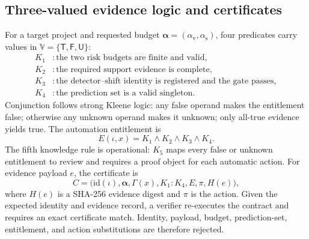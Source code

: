 \documentclass[preprint,12pt]{elsarticle}
\newcommand{\av}{\alpha_{\mathrm{v}}}
\newcommand{\as}{\alpha_{\mathrm{s}}}
\begin{document}
\subsection{Three-valued evidence logic and certificates}

For a target project and requested budget $\boldsymbol{\alpha}=(\av,\as)$, four predicates carry values in $\mathbb V=\{\mathsf T,\mathsf F,\mathsf U\}$:
\begin{align}
 K_1 &: \text{the two risk budgets are finite and valid},\nonumber\\
 K_2 &: \text{the required support evidence is complete},\nonumber\\
 K_3 &: \text{the detector--shift identity is registered and the gate passes},\nonumber\\
 K_4 &: \text{the prediction set is a valid singleton}. \label{eq:rules}
\end{align}
Conjunction follows strong Kleene logic: any false operand makes the entitlement false; otherwise any unknown operand makes it unknown; only all-true evidence yields true. The automation entitlement is
\begin{equation}
 E(\iota,x)=K_1\wedge K_2\wedge K_3\wedge K_4.
 \label{eq:entitlement}
\end{equation}
The fifth knowledge rule is operational: $K_5$ maps every false or unknown entitlement to review and requires a proof object for each automatic action. For evidence payload $e$, the certificate is
\begin{equation}
 C=\bigl(\mathrm{id}(\iota),\boldsymbol{\alpha},\Gamma(x),
          K_1{:}K_4,E,\pi,H(e)\bigr),
 \label{eq:certificate}
\end{equation}
where $H(e)$ is a SHA-256 evidence digest and $\pi$ is the action. Given the expected identity and evidence record, a verifier re-executes the contract and requires an exact certificate match. Identity, payload, budget, prediction-set, entitlement, and action substitutions are therefore rejected.
\end{document}
